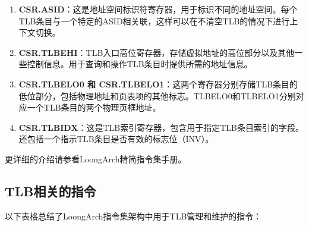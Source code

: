 \begin{enumerate}
\def\labelenumi{\arabic{enumi}.}
\tightlist
\item
  \textbf{CSR.ASID}：这是地址空间标识符寄存器，用于标识不同的地址空间。每个TLB条目与一个特定的ASID相关联，这样可以在不清空TLB的情况下进行上下文切换。
\item
  \textbf{CSR.TLBEHI}：TLB入口高位寄存器，存储虚拟地址的高位部分以及其他一些控制信息。用于查询和操作TLB条目时提供所需的地址信息。
\item
  \textbf{CSR.TLBELO0 和 CSR.TLBELO1}：这两个寄存器分别存储TLB条目的低位部分，包括物理地址和页表项的其他标志。TLBELO0和TLBELO1分别对应一个TLB条目的两个物理页框地址。
\item
  \textbf{CSR.TLBIDX}：这是TLB索引寄存器，包含用于指定TLB条目索引的字段。还包括一个指示TLB条目是否有效的标志位（INV）。
\end{enumerate}

更详细的介绍请参看LoongArch精简指令集手册。

\subsection{TLB相关的指令}\label{sec:10-mmu-011}

以下表格总结了LoongArch指令集架构中用于TLB管理和维护的指令：

